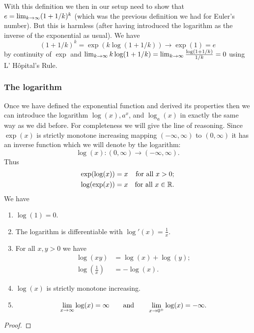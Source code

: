 \documentclass[10pt, a4paper]{article}
\newcommand{\lhopital}[0]{L' H\^opital}
\begin{document}
\begin{remark}
    With this definition we then in our setup need to show that $e = \liminfty[k](1 + 1 / k) ^ k$
    (which was the previous definition we had for Euler's number).
    But this is harmless
    (after having introduced the logarithm as the inverse of the exponential as usual).
    We have
    \[
    (1 + 1 / k) ^ k = \exp(k\log(1 + 1 / k)) \rightarrow \exp(1) = e
    \]
    by continuity of $\exp$ and $\liminfty[k]k\log(1 + 1 / k) = \liminfty[k]\frac{\log(1 + 1 / k)}{1 / k} = 0$ using \lhopital's Rule.
\end{remark}

\subsubsection{The logarithm}
Once we have defined the exponential function and derived its properties then we can introduce the logarithm $\log(x), a ^ x$,
and $\log_a(x)$ in exactly the same way as we did before.
For completeness we will give the line of reasoning.
Since $\exp(x)$ is strictly monotone increasing mapping $(-\infty, \infty)$ to $(0, \infty)$ it has an inverse function which we will denote by the logarithm:
\[
\log(x) : (0, \infty) \rightarrow (-\infty, \infty).
\]
Thus
\begin{align*}
    \exp(\log(x)) &= x&\text{for all } x > 0; \\
    \log(\exp(x)) &= x&\text{for all } x \in \R.
\end{align*}
We have
\begin{theorem}
    \begin{enumerate}[label = (\roman*)]
        \item $\log(1) = 0$.
        \item The logarithm is differentiable with $\log'(x) = \frac{1}{x}$.
        \item For all $x, y > 0$ we have
        \begin{align*}
            \log(xy) &= \log(x) + \log(y); \\
            \log\left(\frac{1}{x}\right) &= -\log(x).
        \end{align*}
        \item $\log(x)$ is strictly monotone increasing.
        \item
        \[
        \liminfty[x]\log(x) = \infty\qquad\text{and}\qquad\lim_{x \rightarrow 0 ^ {+}}\log(x) = -\infty.
        \]
    \end{enumerate}
    \begin{proof}
        
    \end{proof}
\end{theorem}
\end{document}
